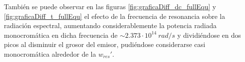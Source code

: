 También se puede observar en las figuras \ref{fig:graficaDiff_dc_fullEqu} y \ref{fig:graficaDiff_t_fullEqu} el efecto de la frecuencia de resonancia sobre la radiación espectral, aumentando considerablemente la potencia radiada monocromática en dicha frecuencia de $\sim 2.373\cdot 10^{14} \ rad/s$ y dividiéndose en dos picos al disminuir el grosor del emisor, pudiéndose considerarse casi monocromática alrededor de la $w_{res}'$.\\\\
\vfill
